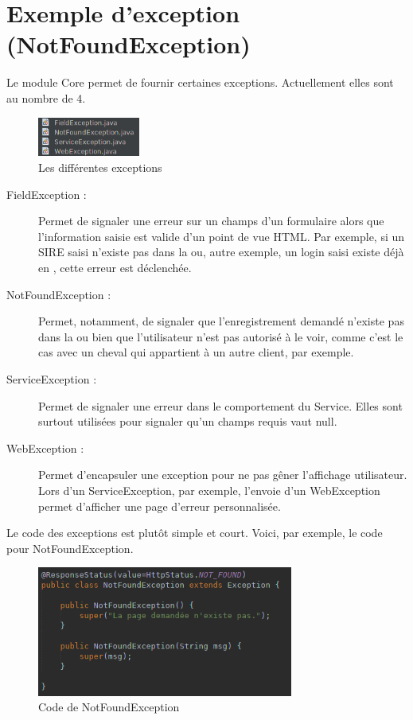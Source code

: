 	\newpage
	\section{Exemple d'exception (NotFoundException)}
		Le module Core permet de fournir certaines exceptions. Actuellement elles sont au nombre de 4.

		\begin{figure}[H]
			\centering\includegraphics[width=0.30\textwidth, keepaspectratio]{res/exceptions.png}
			\caption{Les différentes exceptions}
		\end{figure}

		\begin{description}
			\item[FieldException :]{Permet de signaler une erreur sur un champs d'un formulaire alors que l'information saisie est valide d'un point de vue HTML. Par exemple, si un SIRE saisi n'existe pas dans la \bdd{} ou, autre exemple, un login saisi existe déjà en \bdd{}, cette erreur est déclenchée.}
			\item[NotFoundException :]{Permet, notamment, de signaler que l'enregistrement demandé n'existe pas dans la \bdd{} ou bien que l'utilisateur n'est pas autorisé à le voir, comme c'est le cas avec un cheval qui appartient à un autre client, par exemple.}
			\item[ServiceException :]{Permet de signaler une erreur dans le comportement du Service. Elles sont surtout utilisées pour signaler qu'un champs requis vaut null.}
			\item[WebException :]{Permet d'encapsuler une exception pour ne pas gêner l'affichage utilisateur. Lors d'un ServiceException, par exemple, l'envoie d'un WebException permet d'afficher une page d'erreur personnalisée.}
		\end{description}

		Le code des exceptions est plutôt simple et court. Voici, par exemple, le code pour NotFoundException.

		\begin{figure}[H]
			\centering\includegraphics[width=0.75\textwidth, keepaspectratio]{res/NotFoundException.png}
			\caption{Code de NotFoundException}
		\end{figure}

